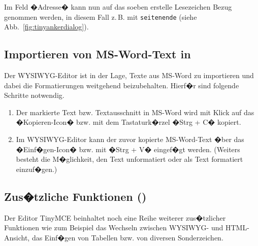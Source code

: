 Im Feld �Adresse� kann nun auf das soeben erstelle Lesezeichen Bezug genommen
werden, in diesem Fall z.\,B. mit \texttt{seitenende} (siehe Abb.~\ref{fig:tinyankerdialog}).

\subsection{Importieren von MS-Word-Text in }
\label{importword}

Der WYSIWYG-Editor  ist in der Lage, Texte aus MS-Word zu importieren
und dabei die Formatierungen weitgehend beizubehalten. Hierf�r sind folgende
Schritte notwendig.

\begin{enumerate}
	\item {Der markierte Text bzw. Textausschnitt in MS-Word wird mit Klick auf das
�Kopieren-Icon� bzw. mit dem Tastaturk�rzel �Strg + C� kopiert.}
	\item {Im WYSIWYG-Editor  kann der zuvor kopierte MS-Word-Text �ber
das �Einf�gen-Icon� bzw. mit �Strg + V� eingef�gt werden. (Weiters
besteht die M�glichkeit, den Text unformatiert oder als Text formatiert
einzuf�gen.)}
\end{enumerate}

\subsection{Zus�tzliche Funktionen ()}
\label{tinyfeatures}

Der Editor TinyMCE beinhaltet noch eine Reihe weiterer zus�tzlicher Funktionen wie
zum Beispiel das Wechseln zwischen WYSIWYG- und HTML-Ansicht, das Einf�gen
von Tabellen bzw. von diversen Sonderzeichen.
